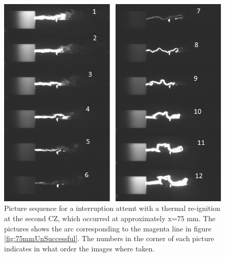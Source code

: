 \documentclass[10pt,b5paper,twoside]{article}
\begin{document}
\begin{figure}[H]
\centering
\includegraphics[scale=0.7, angle =0 ]{Bilder/Results/143_75_TR_TR.png}
\caption{Picture sequence for a interruption attemt with a thermal re-ignition at the second CZ, which occurred at approximately x=75 mm. The pictures shows the arc corresponding to the magenta line in figure \ref{fig:75mmUnSuccessful}. The numbers in the corner of each picture indicates in what order the images where taken.} \label{fig:arcingVoltage_test_116_magenta_TR}
\end{figure}
\end{document}

